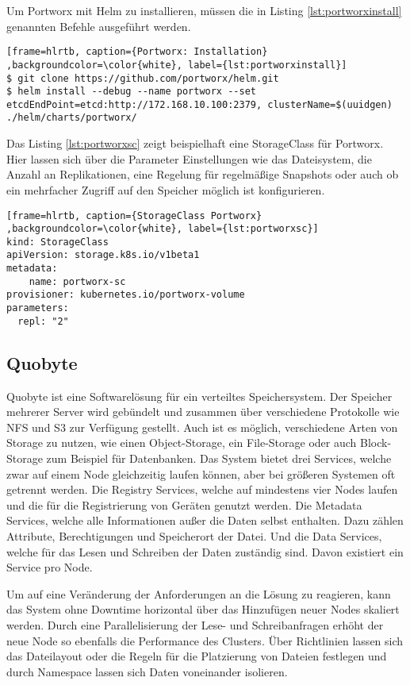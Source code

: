 Um Portworx mit Helm zu installieren, müssen die in Listing \ref{lst:portworxinstall} genannten Befehle ausgeführt werden.
\lstset{language=bash}
\begin{lstlisting}[frame=hlrtb, caption={Portworx: Installation} ,backgroundcolor=\color{white}, label={lst:portworxinstall}]
$ git clone https://github.com/portworx/helm.git
$ helm install --debug --name portworx --set etcdEndPoint=etcd:http://172.168.10.100:2379, clusterName=$(uuidgen) ./helm/charts/portworx/
\end{lstlisting}

Das Listing \ref{lst:portworxsc} zeigt beispielhaft eine StorageClass für Portworx. Hier lassen sich über die Parameter Einstellungen wie das Dateisystem, die Anzahl an Replikationen, eine Regelung für regelmäßige Snapshots oder auch ob ein mehrfacher Zugriff auf den Speicher möglich ist konfigurieren.

\lstset{language=yaml}
\begin{lstlisting}[frame=hlrtb, caption={StorageClass Portworx} ,backgroundcolor=\color{white}, label={lst:portworxsc}]
kind: StorageClass
apiVersion: storage.k8s.io/v1beta1
metadata:
    name: portworx-sc
provisioner: kubernetes.io/portworx-volume
parameters:
  repl: "2"
\end{lstlisting}

\subsection{Quobyte}
Quobyte ist eine Softwarelösung für ein verteiltes Speichersystem. Der Speicher mehrerer Server wird gebündelt und zusammen über verschiedene Protokolle wie NFS und S3 zur Verfügung gestellt. Auch ist es möglich, verschiedene Arten von Storage zu nutzen, wie einen Object-Storage, ein File-Storage oder auch Block-Storage zum Beispiel für Datenbanken. Das System bietet drei Services, welche zwar auf einem Node gleichzeitig laufen können, aber bei größeren Systemen oft getrennt werden. Die Registry Services, welche auf mindestens vier Nodes laufen und die für die Registrierung von Geräten genutzt werden. Die Metadata Services, welche alle Informationen außer die Daten selbst enthalten. Dazu zählen Attribute, Berechtigungen und Speicherort der Datei. Und die Data Services, welche für das Lesen und Schreiben der Daten zuständig sind. Davon existiert ein Service pro Node. \medskip

Um auf eine Veränderung der Anforderungen an die Lösung zu reagieren, kann das System ohne Downtime horizontal über das Hinzufügen neuer Nodes skaliert werden. Durch eine Parallelisierung der Lese- und Schreibanfragen erhöht der neue Node so ebenfalls die Performance des Clusters. Über Richtlinien lassen sich das Dateilayout oder die Regeln für die Platzierung von Dateien festlegen und durch Namespace lassen sich Daten voneinander isolieren.

